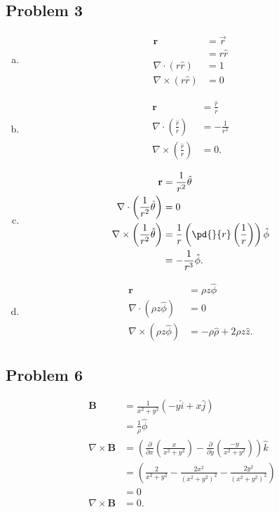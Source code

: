 \documentclass[10pt]{mypackage}
\begin{document}
\subsection{Problem 3}%
\begin{enumerate}[(a)]
  \item 
    \begin{align*}
      \mathbf{r} &= \vec{r}\\
                 &= r\hat{r}\\
      \nabla \cdot \left(r\hat{r}\right) &= 1\\
      \nabla \times \left(r\hat{r}\right) &= 0
    \end{align*}
  \item 
    \begin{align*}
      \mathbf{r} &= \frac{\hat{r}}{r}\\
      \nabla \cdot \left(\frac{\hat{r}}{r}\right) &= -\frac{1}{r^2}\\
      \nabla \times \left(\frac{\hat{r}}{r}\right) &= 0.
    \end{align*}
  \item 
    \begin{align*}
      \mathbf{r} &= \frac{1}{r^2}\hat{\theta}\\
      \nabla \cdot \left(\frac{1}{r^2}\hat{\theta}\right) &= 0\\
      \nabla \times \left(\frac{1}{r^2}\hat{\theta}\right) &= \frac{1}{r}\left(\pd{}{r}\left(\frac{1}{r}\right)\right)\hat{\phi}\\
                                                           &= -\frac{1}{r^3}\hat{\phi}.
    \end{align*}
  \item 
    \begin{align*}
      \mathbf{r} &= \rho z \hat{\phi}\\
      \nabla \cdot \left(\rho z \hat{\phi}\right) &= 0\\
      \nabla \times \left(\rho z \hat{\phi}\right) &= -\rho \hat{\rho} + 2\rho z \hat{z}.
    \end{align*}
\end{enumerate}
\subsection{Problem 6}%
\begin{align*}
  \mathbf{B} &= \frac{1}{x^2 + y^2}\left(-y\hat{i} + x\hat{j}\right)\\
             &= \frac{1}{\rho}\hat{\phi}\\
  \nabla \times \mathbf{B} &= \left(\frac{\partial}{\partial x}\left(\frac{x}{x^2 + y^2}\right) - \frac{\partial}{\partial y}\left(\frac{-y}{x^2 + y^2}\right)\right)\hat{k}\\
                           &= \left(\frac{2}{x^2 + y^2} - \frac{2x^2}{\left(x^2 + y^2\right)^2} - \frac{2y^2}{\left(x^2 + y^2\right)^2}\right)\\
                           &= 0\\
  \nabla \times \mathbf{B} &= 0.
\end{align*}
\end{document}
